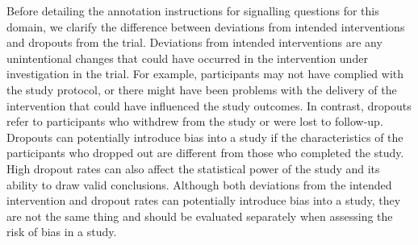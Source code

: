 \documentclass[sn-mathphys,Numbered]{sn-jnl}%
\begin{document}
Before detailing the annotation instructions for signalling questions for this domain, we clarify the difference between deviations from intended interventions and dropouts from the trial.
Deviations from intended interventions are any unintentional changes that could have occurred in the intervention under investigation in the trial.
For example, participants may not have complied with the study protocol, or there might have been problems with the delivery of the intervention that could have influenced the study outcomes.
In contrast, dropouts refer to participants who withdrew from the study or were lost to follow-up.
Dropouts can potentially introduce bias into a study if the characteristics of the participants who dropped out are different from those who completed the study.
High dropout rates can also affect the statistical power of the study and its ability to draw valid conclusions.
Although both deviations from the intended intervention and dropout rates can potentially introduce bias into a study, they are not the same thing and should be evaluated separately when assessing the risk of bias in a study.
%
%
%
\end{document}
